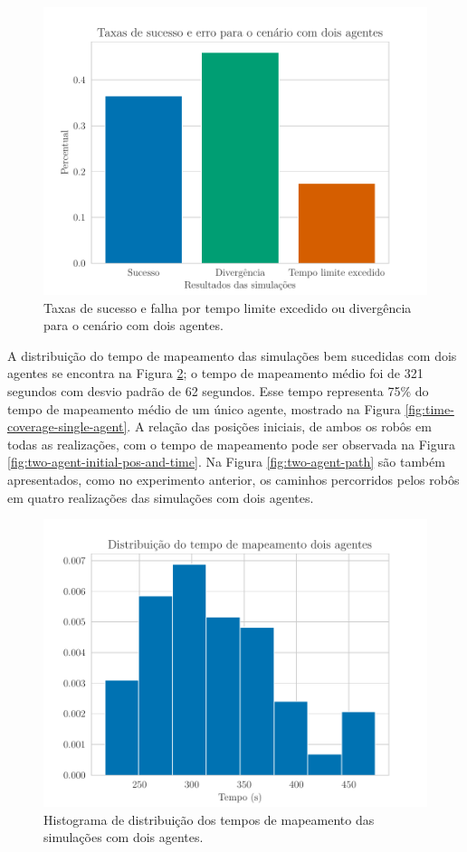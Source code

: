 \begin{figure}
  \centering
  \includegraphics[width=.7\textwidth]{figs/success_rate_bar_two_agents.pdf}
  \caption[Taxas de sucesso e falha para simulações com dois agentes]{Taxas de sucesso e falha por tempo limite excedido ou divergência para o cenário com dois agentes.}
  \label{fig:exp-two-robot-sucess-rate}
\end{figure}

A distribuição do tempo de mapeamento das simulações bem sucedidas com dois agentes se 
encontra na Figura \ref{fig:time-coverage-two-agents}; o tempo de 
mapeamento médio foi de 321 segundos com desvio padrão de 62 segundos. 
Esse tempo representa 75\% do tempo de mapeamento médio de um único 
agente, mostrado na Figura \ref{fig:time-coverage-single-agent}. A 
relação das posições iniciais, de ambos os robôs em todas as realizações, com o tempo de mapeamento pode ser 
observada na Figura \ref{fig:two-agent-initial-pos-and-time}.  Na Figura \ref{fig:two-agent-path} são também apresentados, como no experimento anterior, 
os caminhos percorridos pelos robôs em quatro realizações das 
simulações com dois agentes.

\begin{figure}
  \centering
  \includegraphics[width=.7\textwidth]{figs/time-coverage_two_agents.pdf}
  \caption[Distribuição do tempo de mapeamento de dois agentes]{Histograma de distribuição dos tempos de mapeamento das simulações com dois agentes.}
  \label{fig:time-coverage-two-agents}
\end{figure}

